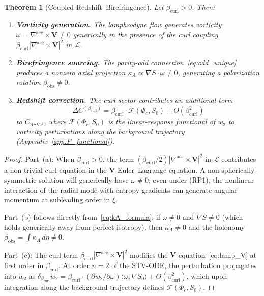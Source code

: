 \documentclass[12pt,a4paper]{article}
\theoremstyle{plain}
\newtheorem{theorem}{Theorem}[section]
\theoremstyle{definition}
\theoremstyle{remark}
\newcommand{\Phic}{\Phi_c}
\newcommand{\Lacc}{\mathcal{L}}
\newcommand{\nabacc}{\nabla^{\!\mathrm{acc}}}
\newcommand{\bcurl}{\beta_{\mathrm{curl}}}
\newcommand{\kA}{\kappa_A}
\begin{document}
\begin{theorem}[Coupled Redshift--Birefringence]
\label{thm:E}
Let $\bcurl > 0$. Then:
\begin{enumerate}[label=\textup{(\alph*)}]
  \item \textbf{Vorticity generation.} The lamphrodyne flow generates vorticity
    $\omega = \nabacc\times\mathbf{V}\neq 0$ generically in the presence of the
    curl coupling $\bcurl|\nabacc\times\mathbf{V}|^2$ in $\Lacc$.
  \item \textbf{Birefringence sourcing.} The parity-odd connection~\eqref{eq:odd_unique}
    produces a nonzero axial projection $\kA \propto \nabla S\cdot\omega\neq 0$,
    generating a polarization rotation $\beta_{\mathrm{obs}}\neq 0$.
  \item \textbf{Redshift correction.} The curl sector contributes an additional term
    \begin{equation}
      \Delta C^{(\bcurl)} = \bcurl\cdot\mathcal{F}(\Phic,S_0) + O(\bcurl^2)
      \label{eq:C_beta_correction}
    \end{equation}
    to $C_{\mathrm{RSVP}}$, where $\mathcal{F}(\Phic,S_0)$ is the linear-response
    functional of $w_2$ to vorticity perturbations along the background trajectory
    (Appendix~\ref{app:F_functional}).
\end{enumerate}
\end{theorem}

\begin{proof}
Part~(a): When $\bcurl > 0$, the term $(\bcurl/2)|\nabacc\times\mathbf{V}|^2$
in $\Lacc$ contributes a non-trivial curl equation in the
$\mathbf{V}$-Euler--Lagrange equation. A non-spherically-symmetric solution will
generically have $\omega\neq 0$; even under \textup{(RP1)}, the nonlinear
interaction of the radial mode with entropy gradients can generate angular momentum
at subleading order in $\xi$.

Part~(b) follows directly from~\eqref{eq:kA_formula}: if $\omega\neq 0$ and $\nabla S\neq 0$
(which holds generically away from perfect isotropy), then $\kA\neq 0$ and the holonomy
$\beta_{\mathrm{obs}} = \int\kA\,d\eta\neq 0$.

Part~(c): The curl term $\bcurl|\nabacc\times\mathbf{V}|^2$ modifies the
$\mathbf{V}$-equation~\eqref{eq:lamp_V} at first order in $\bcurl$. At order $n=2$
of the STV-ODE, the perturbation propagates into $\dot{w}_2$ as $\delta_{\bcurl}\dot{w}_2
= \bcurl\cdot(\partial w_2/\partial\omega)\langle\omega,\nabla S_0\rangle + O(\bcurl^2)$,
which upon integration along the background trajectory defines $\mathcal{F}(\Phic,S_0)$.
\end{proof}
\end{document}
